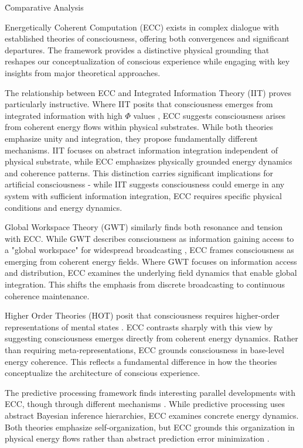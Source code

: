 \h{Comparative Analysis}

\begin{refsection}

Energetically Coherent Computation (ECC) exists in complex dialogue with established theories of consciousness, offering both convergences and significant departures. The framework provides a distinctive physical grounding that reshapes our conceptualization of conscious experience while engaging with key insights from major theoretical approaches.

The relationship between ECC and Integrated Information Theory (IIT) proves particularly instructive. Where IIT posits that consciousness emerges from integrated information with high $\Phi$ values \cite{Koch2018}, ECC suggests consciousness arises from coherent energy flows within physical substrates. While both theories emphasize unity and integration, they propose fundamentally different mechanisms. IIT focuses on abstract information integration independent of physical substrate, while ECC emphasizes physically grounded energy dynamics and coherence patterns. This distinction carries significant implications for artificial consciousness - while IIT suggests consciousness could emerge in any system with sufficient information integration, ECC requires specific physical conditions and energy dynamics.

Global Workspace Theory (GWT) similarly finds both resonance and tension with ECC. While GWT describes consciousness as information gaining access to a "global workspace" for widespread broadcasting \cite{Baars2019}, ECC frames consciousness as emerging from coherent energy fields. Where GWT focuses on information access and distribution, ECC examines the underlying field dynamics that enable global integration. This shifts the emphasis from discrete broadcasting to continuous coherence maintenance.

Higher Order Theories (HOT) posit that consciousness requires higher-order representations of mental states \cite{Block2020}. ECC contrasts sharply with this view by suggesting consciousness emerges directly from coherent energy dynamics. Rather than requiring meta-representations, ECC grounds consciousness in base-level energy coherence. This reflects a fundamental difference in how the theories conceptualize the architecture of conscious experience.

The predictive processing framework finds interesting parallel developments with ECC, though through different mechanisms \cite{Clark2019}. While predictive processing uses abstract Bayesian inference hierarchies, ECC examines concrete energy dynamics. Both theories emphasize self-organization, but ECC grounds this organization in physical energy flows rather than abstract prediction error minimization \cite{Friston2020}.


\end{refsection}
